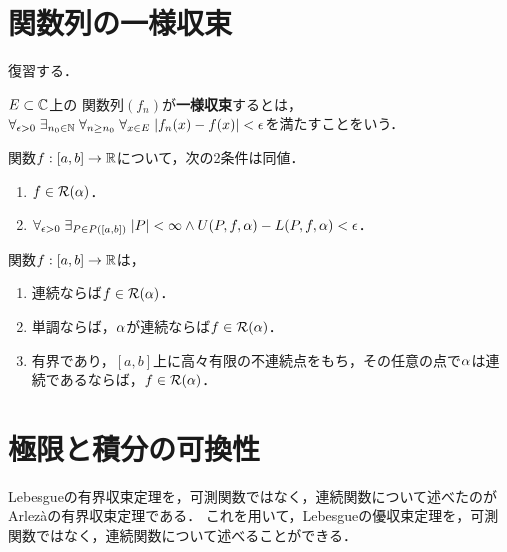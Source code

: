 \documentclass[uplatex, dvipdfmx]{jsreport}
\begin{document}
\section{関数列の一様収束}

\begin{tcolorbox}[colframe=ForestGreen, colback=ForestGreen!10!white,breakable,colbacktitle=ForestGreen!40!white,coltitle=black,fonttitle=\bfseries\sffamily,
title=]
    復習する．
\end{tcolorbox}

\begin{definition}
    $E\subset\mathbb{C}$上の
    関数列$(f_n)$が\textbf{一様収束}するとは，$\forall_{\epsilon>0}\;\exists_{n_0\in\mathbb{N}}\;\forall_{n\ge n_0}\;\forall_{x\in E}\;\lvert f_n(x)-f(x)\rvert<\epsilon$を満たすことをいう．
\end{definition}

\begin{theorem}[可積分性の特徴付け]
    関数$f:[a,b]\to\mathbb{R}$について，次の2条件は同値．
    \begin{enumerate}
        \item $f\in\mathcal{R}(\alpha)$．
        \item $\forall_{\epsilon>0}\;\exists_{P\in P([a,b])}\;\lvert P\rvert<\infty\land U(P,f,\alpha)-L(P,f,\alpha)<\epsilon$．
    \end{enumerate}
\end{theorem}

\begin{theorem}[可積分条件]\mbox{}
    関数$f:[a,b]\to\mathbb{R}$は，
    \begin{enumerate}
        \item 連続ならば$f\in\mathcal{R}(\alpha)$．
        \item 単調ならば，$\alpha$が連続ならば$f\in\mathcal{R}(\alpha)$．
        \item 有界であり，$[a,b]$上に高々有限の不連続点をもち，その任意の点で$\alpha$は連続であるならば，$f\in\mathcal{R}(\alpha)$．
    \end{enumerate}
\end{theorem}

\section{極限と積分の可換性}

\begin{tcolorbox}[colframe=ForestGreen, colback=ForestGreen!10!white,breakable,colbacktitle=ForestGreen!40!white,coltitle=black,fonttitle=\bfseries\sffamily,
title=]
    Lebesgueの有界収束定理を，可測関数ではなく，連続関数について述べたのがArlezàの有界収束定理である．
    これを用いて，Lebesgueの優収束定理を，可測関数ではなく，連続関数について述べることができる．
\end{tcolorbox}
\end{document}
